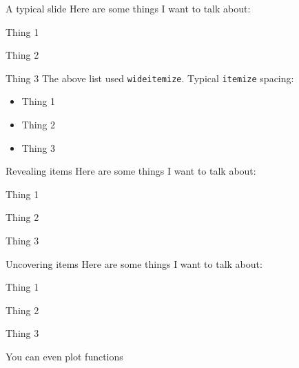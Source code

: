 \documentclass{beamer}
\newenvironment{wideitemize}{\itemize\addtolength{\itemsep}{10pt}}{\enditemize}
\begin{document}
\begin{frame}{A typical slide}
	Here are some things I want to talk about:\\
	\vspace{.5cm}
	\begin{wideitemize}
		\item Thing 1
		\item Thing 2
		\item Thing 3
	\end{wideitemize}
	\vspace{1cm}
	The above list used \texttt{wideitemize}. Typical \texttt{itemize} spacing:
	\begin{itemize}
		\item Thing 1
		\item Thing 2
		\item Thing 3
	\end{itemize}
\end{frame}


\begin{frame}{Revealing items}
	Here are some things I want to talk about:\\
	\vspace{.5cm}
	\begin{wideitemize}
		\item<1->{Thing 1}
		\item<2->{Thing 2}
		\item<3>{Thing 3}
	\end{wideitemize}
\end{frame}

\begin{frame}{Uncovering items}
	Here are some things I want to talk about:\\
	\vspace{.5cm}
	\begin{wideitemize}
	\item<1>Thing 1
	\item<2->Thing 2
	\item<3>Thing 3
	\end{wideitemize}
\end{frame}

\begin{frame}{You can even plot functions}
	\begin{figure}[h!]
	\end{figure}
\end{frame}
\end{document}
